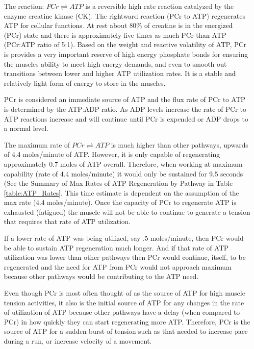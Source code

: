 The reaction: $PCr \rightleftharpoons ATP$ is a reversible high rate reaction catalyzed by the enzyme creatine kinase (CK). The rightward reaction (PCr to ATP) regenerates ATP for cellular functions. At rest about 80\% of creatine is in the energized (PCr) state and there is approximately five times as much PCr than ATP (PCr:ATP ratio of 5:1). Based on the weight and reactive volatility of ATP, PCr is provides a very important reserve of high energy phosphate bonds for ensuring the muscles ability to meet high energy demands, and even to smooth out transitions between lower and higher ATP utilization rates.\footnotemark{} It is a stable and relatively light form of energy to store in the muscles.

PCr is considered an immediate source of ATP and the flux rate of PCr to ATP is determined by the ATP:ADP ratio. As ADP levels increase the rate of PCr to ATP reactions increase and will continue until PCr is expended or ADP drops to a normal level.

The maximum rate of $PCr \rightleftharpoons ATP$ is much higher than other pathways, upwards of 4.4 moles/minute of ATP. However, it is only capable of regenerating approximately 0.7 moles of ATP overall. Therefore, when working at maximum capability (rate of 4.4 moles/minute) it would only be sustained for 9.5 seconds (See the Summary of Max Rates of ATP Regeneration by Pathway in Table \ref{table:ATP_Rates}. This time estimate is dependent on the assumption of the max rate (4.4 moles/minute). Once the capacity of PCr to regenerate ATP is exhausted (fatigued) the muscle will not be able to continue to generate a tension that requires that rate of ATP utilization.

If a lower rate of ATP was being utilized, say .5 moles/minute, then PCr would be able to sustain ATP regeneration much longer. And if that rate of ATP utilization was lower than other pathways then PCr would continue, itself, to be regenerated and the need for ATP from PCr would not approach maximum because other pathways would be contributing to the ATP need.

Even though PCr is most often thought of as the source of ATP for high muscle tension activities, it also is the initial source of ATP for any changes in the rate of utilization of ATP because other pathways have a delay (when compared to PCr) in how quickly they can start regenerating more ATP. Therefore, PCr is the source of ATP for a sudden burst of tension such as that needed to increase pace during a run, or increase velocity of a movement.

